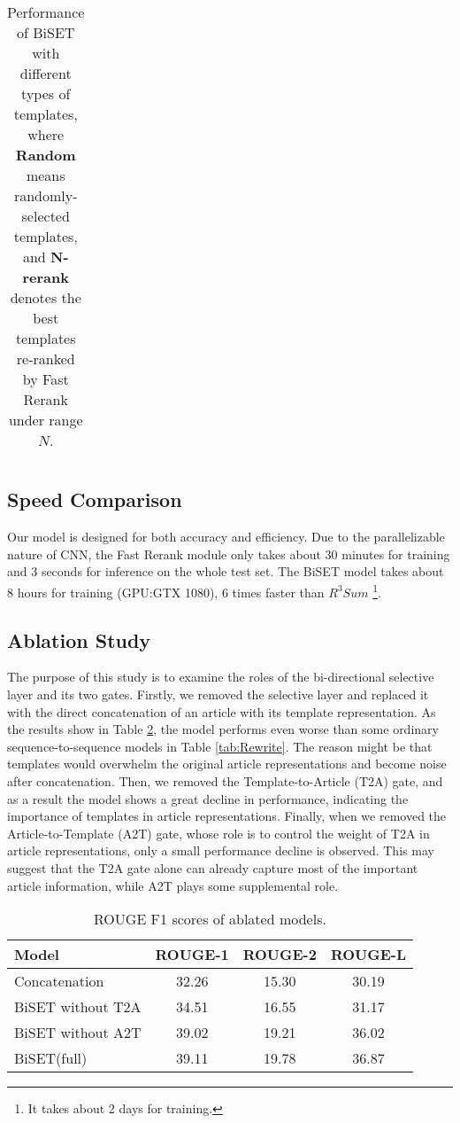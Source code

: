 \documentclass[11pt,a4paper]{article}
\begin{document}
\begin{spacing}{1.0}
\begin{table}[h]
\begin{tabular}{@{}l|ccc@{}}
        \bottomrule
	\end{tabular}
	\caption{Performance of BiSET with different types of templates, where \textbf{Random} means randomly-selected templates, and \textbf{N-rerank} denotes the best templates re-ranked by Fast Rerank under range $N$.}
\label{tab:Roubustness}
\end{table}

\subsection{Speed Comparison} Our model is designed for both accuracy and efficiency. Due to the parallelizable nature of CNN, the Fast Rerank module only takes about 30 minutes for training and 3 seconds for inference on the whole test set. The BiSET model takes about 8 hours for training (GPU:GTX 1080), 6 times faster than $R^3Sum$ \cite{cao2018retrieve}\footnote{It takes about 2 days for training.}.

\subsection{Ablation Study}
The purpose of this study is to examine the roles of the bi-directional selective layer and its two gates. Firstly, we removed the selective layer and replaced it with the direct concatenation of an article with its template representation. As the results show in Table \ref{tab:Ablation}, the model performs even worse than some ordinary sequence-to-sequence models in Table \ref{tab:Rewrite}. The reason might be that templates would overwhelm the original article representations and become noise after concatenation. Then, we removed the Template-to-Article (T2A) gate, and as a result the model shows a great decline in performance, indicating the importance of templates in article representations. Finally, when we removed the Article-to-Template (A2T) gate, whose role is to control the weight of T2A in article representations, only a small performance decline is observed. This may suggest that the T2A gate alone can already capture most of the important article information, while A2T plays some supplemental role.

\begin{table}[t]
\small
	
	\centering
	\begin{tabular}{@{}l|ccc@{}}
		\toprule
        Model & ROUGE-1   & ROUGE-2  & ROUGE-L  \\
        \hline
        Concatenation  & 32.26 & 15.30 & 30.19 \\
        BiSET without T2A   & 34.51 & 16.55 & 31.17 \\
        BiSET without A2T  & 39.02 & 19.21 & 36.02 \\
        BiSET(full) & 39.11 & 19.78 & 36.87 \\
        \bottomrule
	\end{tabular}
	\caption{ROUGE F1 scores of ablated models.}
\label{tab:Ablation}
\end{table}


\end{spacing}
\end{document}
